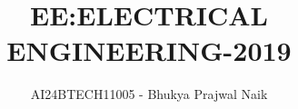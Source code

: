\documentclass[journal]{IEEEtran}
\begin{document}

\vspace{3cm}

\title{EE:ELECTRICAL ENGINEERING-2019}
\author{AI24BTECH11005 - Bhukya Prajwal Naik
}
{\let\newpage\relax\maketitle}

\renewcommand{\thefigure}{\theenumi}
\renewcommand{\thetable}{\theenumi}
\setlength{\intextsep}{10pt} %


\renewcommand{\thetable}{\theenumi}
\end{document}

